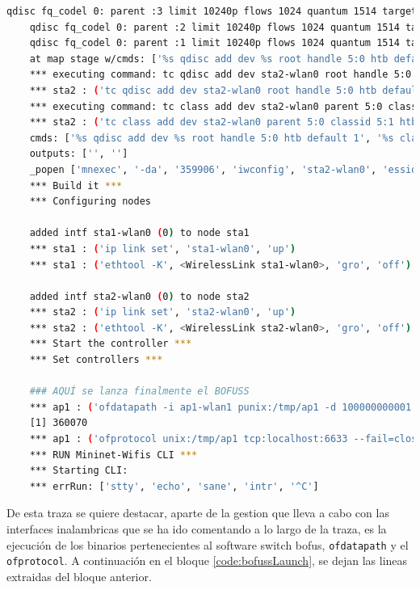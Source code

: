\begin{lstlisting}[language= bash, style=Consola, caption={Traza de la puesta en marcha del escenario básico},label=code:trazatopobasic]
    qdisc fq_codel 0: parent :3 limit 10240p flows 1024 quantum 1514 target 5ms interval 100ms memory_limit 32Mb ecn drop_batch 64 
    qdisc fq_codel 0: parent :2 limit 10240p flows 1024 quantum 1514 target 5ms interval 100ms memory_limit 32Mb ecn drop_batch 64 
    qdisc fq_codel 0: parent :1 limit 10240p flows 1024 quantum 1514 target 5ms interval 100ms memory_limit 32Mb ecn drop_batch 64 
    at map stage w/cmds: ['%s qdisc add dev %s root handle 5:0 htb default 1', '%s class add dev %s parent 5:0 classid 5:1 htb rate 11.000000Mbit burst 15k']
    *** executing command: tc qdisc add dev sta2-wlan0 root handle 5:0 htb default 1
    *** sta2 : ('tc qdisc add dev sta2-wlan0 root handle 5:0 htb default 1',)
    *** executing command: tc class add dev sta2-wlan0 parent 5:0 classid 5:1 htb rate 11.000000Mbit burst 15k
    *** sta2 : ('tc class add dev sta2-wlan0 parent 5:0 classid 5:1 htb rate 11.000000Mbit burst 15k',)
    cmds: ['%s qdisc add dev %s root handle 5:0 htb default 1', '%s class add dev %s parent 5:0 classid 5:1 htb rate 11.000000Mbit burst 15k'] 
    outputs: ['', ''] 
    _popen ['mnexec', '-da', '359906', 'iwconfig', 'sta2-wlan0', 'essid', 'new-ssid', 'ap', '00:00:00:00:00:01'] 360065
    *** Build it ***
    *** Configuring nodes

    added intf sta1-wlan0 (0) to node sta1
    *** sta1 : ('ip link set', 'sta1-wlan0', 'up')
    *** sta1 : ('ethtool -K', <WirelessLink sta1-wlan0>, 'gro', 'off')

    added intf sta2-wlan0 (0) to node sta2
    *** sta2 : ('ip link set', 'sta2-wlan0', 'up')
    *** sta2 : ('ethtool -K', <WirelessLink sta2-wlan0>, 'gro', 'off')
    *** Start the controller ***
    *** Set controllers ***

    ### AQUÍ se lanza finalmente el BOFUSS
    *** ap1 : ('ofdatapath -i ap1-wlan1 punix:/tmp/ap1 -d 100000000001 --no-slicing 1> /tmp/ap1-ofd.log 2> /tmp/ap1-ofd.log &',)
    [1] 360070
    *** ap1 : ('ofprotocol unix:/tmp/ap1 tcp:localhost:6633 --fail=closed  --listen=punix:/tmp/ap1.listen 1> /tmp/ap1-ofp.log 2>/tmp/ap1-ofp.log &',)
    *** RUN Mininet-Wifis CLI ***
    *** Starting CLI:
    *** errRun: ['stty', 'echo', 'sane', 'intr', '^C'] 
\end{lstlisting}
\vspace{0.5cm}

De esta traza se quiere destacar, aparte de la gestion que lleva a cabo con las interfaces inalambricas que se ha ido comentando a lo largo de la traza, es la ejecución de los binarios pertenecientes al software switch \gls{bofus}, \texttt{ofdatapath} y el \texttt{ofprotocol}. A continuación en el bloque \ref{code:bofussLaunch}, se dejan las lineas extraidas del bloque anterior. 

